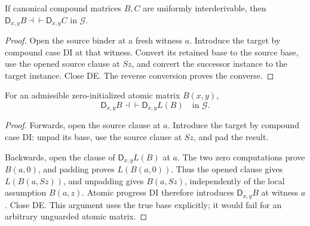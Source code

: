 \begin{lemma}
If canonical compound matrices $B,C$ are uniformly interderivable,
then $\mathsf D_{x,y}B\dashv\vdash\mathsf D_{x,y}C$ in $\mathcal G$.
\end{lemma}
\begin{proof}
Open the source binder at a fresh witness $a$.  Introduce the target
by compound case DI at that witness.  Convert its retained base to
the source base, use the opened source clause at $Sz$, and convert
the successor instance to the target instance.  Close DE.  The
reverse conversion proves the converse.
\end{proof}

\begin{lemma}
For an admissible zero-initialized atomic matrix $B(x,y)$,
\[
 \mathsf D_{x,y}B\dashv\vdash\mathsf D_{x,y}L(B)
 \quad\text{in }\mathcal G.
 \tag{Atomic composite}\label{eq:guarded-atomic-composite}
\]
\end{lemma}
\begin{proof}
Forwards, open the source clause at $a$.  Introduce the target by
compound case DI: unpad its base, use the source clause at $Sz$, and
pad the result.

Backwards, open the clause of $\mathsf D_{x,y}L(B)$ at $a$.
The two zero computations prove $B(a,0)$, and padding proves
$L(B(a,0))$.
Thus the opened clause gives $L(B(a,Sz))$, and unpadding gives
$B(a,Sz)$, independently of the local assumption $B(a,z)$.
Atomic progress DI therefore introduces $\mathsf D_{x,y}B$ at
witness $a$.  Close DE.  This argument uses the true base explicitly;
it would fail for an arbitrary unguarded atomic matrix.
\end{proof}

